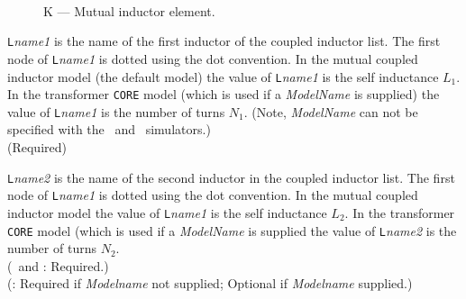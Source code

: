 
\begin{figure}[h]
\centering
\ 
\caption{K --- Mutual inductor element.}
\end{figure}




\begin{widelist}
\item[{\tt L}{\it name1}] is the name of the first inductor of the
coupled inductor list. The first node of {\tt L}{\it name1} is
dotted using the dot convention.
In the mutual coupled inductor model (the default model) the value of
{\tt L}{\it name1} is the self inductance $L_1$.
In the transformer {\tt CORE} model
(which is used if a {\it ModelName} is supplied)
the value of {\tt L}{\it name1} is the number of turns $N_1$.
(Note, {\it ModelName} can not be specified with the
\spicetwo\ and \spicethree\ simulators.)\\
(Required)

\item[{\tt L}{\it name2}] is the name of the second inductor in the
coupled inductor list. The first node of {\tt L}{\it name1} is
dotted using the dot convention.
In the mutual coupled inductor model the value of
{\tt L}{\it name1} is the self inductance $L_2$.
In the transformer {\tt CORE} model (which is used if a {\it ModelName}
is supplied the value of {\tt L}{\it name2} is the number of turns $N_2$.\\
(\spicetwo\ and \spicethree: Required.)\\
(\pspice : Required if {\it Modelname} not supplied;
Optional if {\it Modelname} supplied.)
\end{widelist}

